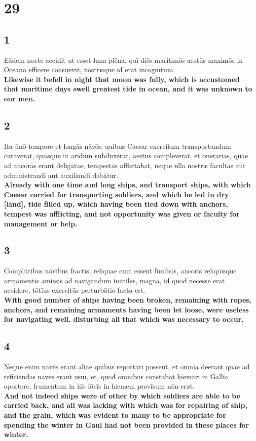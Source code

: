 \documentclass{article}
\begin{document}
\section*{29}

\subsection*{1} 
Eādem nocte accidit ut esset luna plēna, quī diēs maritimōs aestūs maximōs in Ōceanō efficere consuēvit, nostrīsque id erat incognītum. \\
\textbf{Likewise it befell in night that moon was fully, which is accustomed that maritime days swell greatest tide in ocean, and it was unknown to our men.}

\subsection*{2} 
Ita ūnō tempore et longās nāvēs, quibus Caesar exercitum transportandum curāverat, quāsque in aridum subdūxerat, aestus complēverat, et onerāriās, quae ad ancorās erant deligātae, tempestās afflictābat, neque ūlla nostrīs facultās aut administrandī aut auxiliandī dabātur.\\
\textbf{Already with one time and long ships, and transport ships, with which Caesar carried for transporting soldiers, and which he led in dry [land], tide filled up, which having been tied down with anchors, tempest was afflicting, and not opportunity was given or faculty for management or help.}

\subsection*{3} 
Complūribus nāvibus fractīs, reliquae cum essent fūnibus, ancorīs reliquīsque armamentīs amissīs ad navigandum inūtilēs, magna, id quod necesse erat accidere, tōtīus exercitūs perturbātio facta est. \\
\textbf{With good number of ships having been broken, remaining with ropes, anchors, and remaining armaments having been let loose, were useless for navigating well, disturbing all that which was necessary to occur,  }

\subsection*{4} 
Neque enim nāvēs erant aliae quibus reportārī possent, et omnia dēerant quae ad reficiendās nāvēs erant usuī, et, quod omnibus constābat hiemārī in Galliā oportere, frumentum in hīs lōcīs in hiemem provīsum nōn erat.\\
\textbf{And not indeed ships were of other by which soldiers are able to be carried back, and all was lacking with which was for repairing of ship, and the grain, which was evident to many to be appropriate for spending the winter in Gaul had not been provided in these places for winter. }
\end{document}
